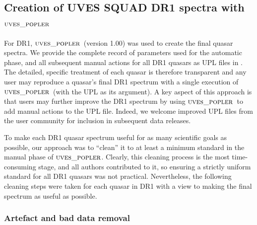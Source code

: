 \documentclass[fleqn,usenatbib,usedcolumn]{mnras}
\newcommand{\popler}{\ensuremath{\textsc{uves\_popler}}}
\begin{document}
\subsection{Creation of UVES SQUAD DR1 spectra with \popler}\label{ss:poplerDR1}

For DR1, \popler\ (version 1.00) was used to create the final quasar spectra. We provide the complete record of parameters used for the automatic phase, and all subsequent manual actions for all DR1 quasars as UPL files in \citet{Murphy:2018:UVESSQUADDR1}. The detailed, specific treatment of each quasar is therefore transparent and any user may reproduce a quasar's final DR1 spectrum with a single execution of \popler\ (with the UPL as its argument). A key aspect of this approach is that users may further improve the DR1 spectrum by using \popler\ to add manual actions to the UPL file. Indeed, we welcome improved UPL files from the user community for inclusion in subsequent data releases.

To make each DR1 quasar spectrum useful for as many scientific goals as possible, our approach was to ``clean'' it to at least a minimum standard in the manual phase of \popler. Clearly, this cleaning process is the most time-consuming stage, and all authors contributed to it, so ensuring a strictly uniform standard for all DR1 quasars was not practical. Nevertheless, the following cleaning steps were taken for each quasar in DR1 with a view to making the final spectrum as useful as possible.

\subsubsection{Artefact and bad data removal}\label{sss:artefacts}
\end{document}
